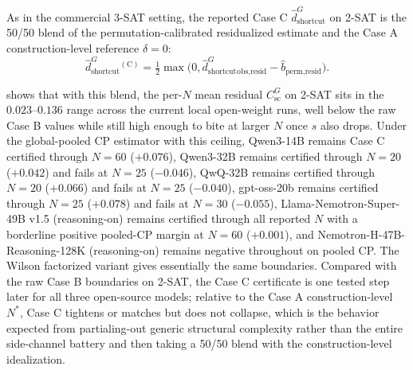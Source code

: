 \documentclass[conference]{IEEEtran}
\theoremstyle{remark}
\newcommand{\shortcutDisc}{d_{\mathrm{shortcut}}^{G}}
\newcommand{\shortcutCeiling}{C_{\mathrm{sc}}^{G}}
\begin{document}
As in the commercial 3-SAT setting, the reported Case C $\hat\shortcutDisc$ on 2-SAT is the 50/50 blend of the permutation-calibrated residualized estimate and the Case A construction-level reference $\delta=0$:
\[
\hat\shortcutDisc^{(\text{C})}
=
\tfrac{1}{2}\max\!\bigl(0,\hat\shortcutDisc_{\text{obs,resid}}-\hat b_{\text{perm,resid}}\bigr).
\]

 shows that with this blend, the per-$N$ mean residual $\shortcutCeiling$ on 2-SAT sits in the $0.023$--$0.136$ range across the current local open-weight runs, well below the raw Case B values while still high enough to bite at larger $N$ once $\hat{s}$ also drops.
Under the global-pooled CP estimator with this ceiling, Qwen3-14B remains Case C certified through $N=60$ ($+0.076$), Qwen3-32B remains certified through $N=20$ ($+0.042$) and fails at $N=25$ ($-0.046$), QwQ-32B remains certified through $N=20$ ($+0.066$) and fails at $N=25$ ($-0.040$), gpt-oss-20b remains certified through $N=25$ ($+0.078$) and fails at $N=30$ ($-0.055$), Llama-Nemotron-Super-49B v1.5 (reasoning-on) remains certified through all reported $N$ with a borderline positive pooled-CP margin at $N=60$ ($+0.001$), and Nemotron-H-47B-Reasoning-128K (reasoning-on) remains negative throughout on pooled CP.
The Wilson factorized variant gives essentially the same boundaries.
Compared with the raw Case B boundaries on 2-SAT, the Case C certificate is one tested step later for all three open-source models; relative to the Case A construction-level $N^{*}$, Case C tightens or matches but does not collapse, which is the behavior expected from partialing-out generic structural complexity rather than the entire side-channel battery and then taking a 50/50 blend with the construction-level idealization.
\end{document}
